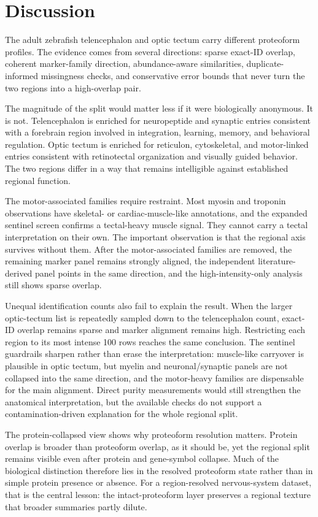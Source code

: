 \section{Discussion}

The adult zebrafish telencephalon and optic tectum carry different proteoform profiles. The evidence comes from several directions: sparse exact-ID overlap, coherent marker-family direction, abundance-aware similarities, duplicate-informed missingness checks, and conservative error bounds that never turn the two regions into a high-overlap pair.

The magnitude of the split would matter less if it were biologically anonymous. It is not. Telencephalon is enriched for neuropeptide and synaptic entries consistent with a forebrain region involved in integration, learning, memory, and behavioral regulation. Optic tectum is enriched for reticulon, cytoskeletal, and motor-linked entries consistent with retinotectal organization and visually guided behavior. The two regions differ in a way that remains intelligible against established regional function.

The motor-associated families require restraint. Most myosin and troponin observations have skeletal- or cardiac-muscle-like annotations, and the expanded sentinel screen confirms a tectal-heavy muscle signal. They cannot carry a tectal interpretation on their own. The important observation is that the regional axis survives without them. After the motor-associated families are removed, the remaining marker panel remains strongly aligned, the independent literature-derived panel points in the same direction, and the high-intensity-only analysis still shows sparse overlap.

Unequal identification counts also fail to explain the result. When the larger optic-tectum list is repeatedly sampled down to the telencephalon count, exact-ID overlap remains sparse and marker alignment remains high. Restricting each region to its most intense 100 rows reaches the same conclusion. The sentinel guardrails sharpen rather than erase the interpretation: muscle-like carryover is plausible in optic tectum, but myelin and neuronal/synaptic panels are not collapsed into the same direction, and the motor-heavy families are dispensable for the main alignment. Direct purity measurements would still strengthen the anatomical interpretation, but the available checks do not support a contamination-driven explanation for the whole regional split.

The protein-collapsed view shows why proteoform resolution matters. Protein overlap is broader than proteoform overlap, as it should be, yet the regional split remains visible even after protein and gene-symbol collapse. Much of the biological distinction therefore lies in the resolved proteoform state rather than in simple protein presence or absence. For a region-resolved nervous-system dataset, that is the central lesson: the intact-proteoform layer preserves a regional texture that broader summaries partly dilute.

